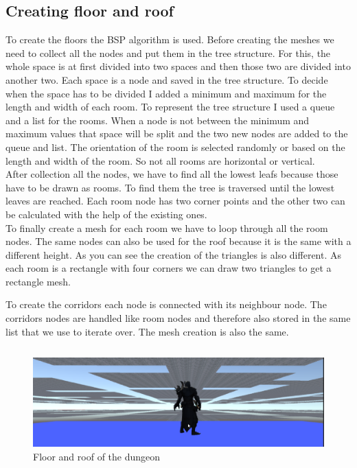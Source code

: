 \documentclass[a4paper,11pt,oneside]{scrreprt}
\begin{document}
\subsection{Creating floor and roof}
To create the floors the BSP algorithm is used. Before creating the meshes we need to collect all the nodes and put them in the tree structure. For this, the whole space is at first divided into two spaces and then those two are divided into another two. Each space is a node and saved in the tree structure. To decide when the space has to be divided I added a minimum and maximum for the length and width of each room. To represent the tree structure I used a queue and a list for the rooms. When a node is not between the minimum and maximum values that space will be split and the two new nodes are added to the queue and list. The orientation of the room is selected randomly or based on the length and width of the room. So not all rooms are horizontal or vertical.
\\
After collection all the nodes, we have to find all the lowest leafs because those have to be drawn as rooms. To find them the tree is traversed until the lowest leaves are reached. Each room node has two corner points and the other two can be calculated with the help of the existing ones. 
\\
To finally create a mesh for each room we have to loop through all the room nodes. The same nodes can also be used for the roof because it is the same with a different height. As you can see the creation of the triangles is also different. As each room is a rectangle with four corners we can draw two triangles to get a rectangle mesh.

\newpage
To create the corridors each node is connected with its neighbour node. The corridors nodes are handled like room nodes and therefore also stored in the same list that we use to iterate over. The mesh creation is also the same.
\inputminted[fontsize=\footnotesize,linenos]{csharp}{code/CreateFloorRoof.cs}

\begin{figure}[htb]
	\centering
	\includegraphics[scale=0.5]{images/dungeon_floor_and_roof.png}  
	\caption{Floor and roof of the dungeon}
	\label{fig:floor-roof}
\end{figure}
\end{document}
